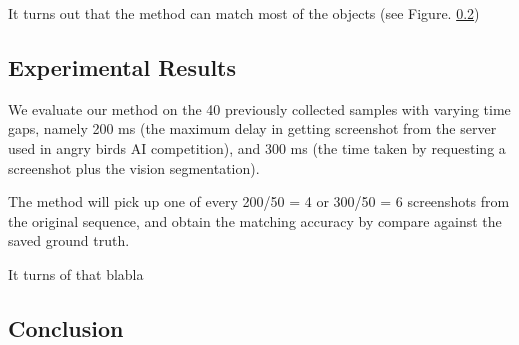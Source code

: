 \documentclass[letterpaper]{article}
\begin{document}
It turns out that the method can match most of the objects (see Figure. \ref{}) 



\subsection{Experimental Results}

We evaluate our method on the 40 previously collected samples with varying time gaps, namely 200 ms (the maximum delay in getting screenshot from the server used in angry birds AI competition), and 300 ms (the time taken by requesting a screenshot plus the vision segmentation). 

The method will pick up one of every 200/50 = 4 or 300/50 = 6 screenshots from the original sequence, and obtain the matching accuracy by compare against the saved ground truth.  

It turns of that blabla




\subsection{Conclusion}
\end{document}
